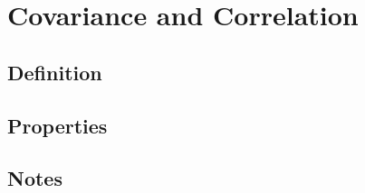 \section{Covariance and Correlation}

\subsection{Definition}

\subsection{Properties}

\subsection{Notes}